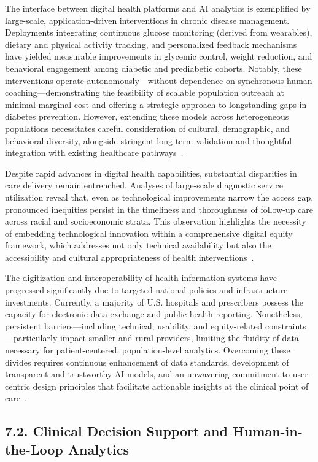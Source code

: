 \documentclass[11pt]{article}
\begin{document}
The interface between digital health platforms and AI analytics is exemplified by large-scale, application-driven interventions in chronic disease management. Deployments integrating continuous glucose monitoring (derived from wearables), dietary and physical activity tracking, and personalized feedback mechanisms have yielded measurable improvements in glycemic control, weight reduction, and behavioral engagement among diabetic and prediabetic cohorts. Notably, these interventions operate autonomously—without dependence on synchronous human coaching—demonstrating the feasibility of scalable population outreach at minimal marginal cost and offering a strategic approach to longstanding gaps in diabetes prevention. However, extending these models across heterogeneous populations necessitates careful consideration of cultural, demographic, and behavioral diversity, alongside stringent long-term validation and thoughtful integration with existing healthcare pathways~\cite{ref69}.

Despite rapid advances in digital health capabilities, substantial disparities in care delivery remain entrenched. Analyses of large-scale diagnostic service utilization reveal that, even as technological improvements narrow the access gap, pronounced inequities persist in the timeliness and thoroughness of follow-up care across racial and socioeconomic strata. This observation highlights the necessity of embedding technological innovation within a comprehensive digital equity framework, which addresses not only technical availability but also the accessibility and cultural appropriateness of health interventions~\cite{ref85}.

The digitization and interoperability of health information systems have progressed significantly due to targeted national policies and infrastructure investments. Currently, a majority of U.S. hospitals and prescribers possess the capacity for electronic data exchange and public health reporting. Nonetheless, persistent barriers—including technical, usability, and equity-related constraints—particularly impact smaller and rural providers, limiting the fluidity of data necessary for patient-centered, population-level analytics. Overcoming these divides requires continuous enhancement of data standards, development of transparent and trustworthy AI models, and an unwavering commitment to user-centric design principles that facilitate actionable insights at the clinical point of care~\cite{ref82,ref84}.

\subsection{7.2. Clinical Decision Support and Human-in-the-Loop Analytics}
\end{document}
